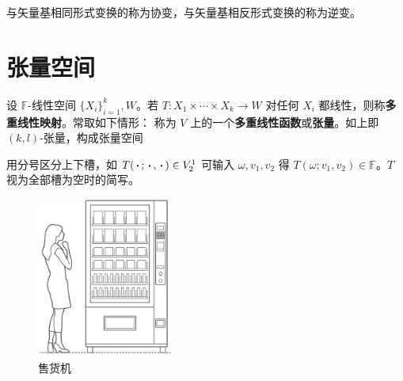 
与矢量基相同形式变换的称为协变，与矢量基相反形式变换的称为逆变。


\section{张量空间}

\begin{definition}
    设 $\mathbb F$-线性空间 $\{X_i\}_{i=1}^k,W$。若
    $T:X_1\times\cdots\times X_k\to W$
    对任何 $X_i$ 都线性，则称\textbf{多重线性映射}。常取如下情形：
    称为 $V$ 上的一个\textbf{多重线性函数}或\textbf{张量}。如上即 $(k,l)$-张量，构成张量空间
\end{definition}
\begin{remark}
    用分号区分上下槽，如 $T(\oo;\oo,\oo)\in V^1_2$ 可输入 $\omega,v_1,v_2$ 得 $T(\omega;v_1,v_2)\in\mathbb F$。$T$ 视为全部槽为空时的简写。
\end{remark}

\begin{figure}[ht]
    \centering
    \includegraphics[width=0.4\textwidth]{fig/appx/vending.jpg}
    \caption{售货机}
    \label{fig:vending}
\end{figure}


